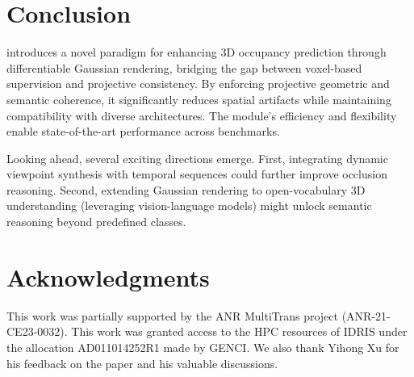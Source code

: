 \section{Conclusion}
\label{sec:ccl}
{\method{} introduces a novel paradigm for enhancing 3D occupancy prediction through differentiable Gaussian rendering, bridging the gap between voxel-based supervision and projective consistency. By enforcing {projective} geometric and semantic coherence, 
it
significantly reduces spatial artifacts while maintaining compatibility with diverse architectures. The module's efficiency and flexibility enable state-of-the-art performance across benchmarks.}

{Looking ahead, several exciting directions emerge. First, integrating dynamic viewpoint synthesis with temporal sequences could further improve occlusion reasoning. Second, extending Gaussian rendering to open-vocabulary 3D understanding (leveraging vision-language models) might unlock semantic reasoning beyond predefined classes.}

\section{Acknowledgments}
This work was partially supported by the ANR MultiTrans project (ANR-21-CE23-0032). This work was granted access to the HPC resources of IDRIS under the allocation AD011014252R1 made by GENCI. We also thank Yihong Xu for his feedback on the paper and his valuable discussions.